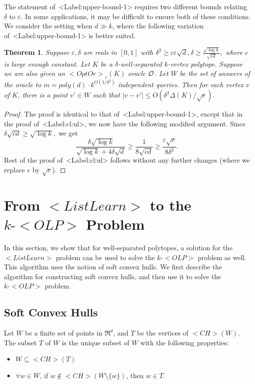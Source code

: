 \documentclass[11pt,letterpaper]{article}
\def\mathsf#1{<#1>}%
\def\xspace{}%
\def\Cref#1{<Label:#1>}%
\newtheorem{theorem}{Theorem}[section]
\theoremstyle{definition}
\theoremstyle{remark}
\newcommand{\ch}{{\mathsf{CH}}}
\newcommand{\olp}{{\mathsf {OLP}}\xspace}
\newcommand{\kolp}{k\mbox{-}\olp}
\newcommand{\ListLearn}{\mathsf {ListLearn}\xspace}
\newcommand{\opto}{{\mathsf{OptOr}}}
\begin{document}
The statement of~\Cref{upper-bound-1} requires two different bounds relating $\delta$ to $\varepsilon$. In some applications, it may be difficult to ensure both of these conditions. We consider the setting when $d \gg k$, where the following variation of~\Cref{upper-bound-1} is better suited. 

\begin{theorem}\label{upper-bound-2}
Suppose $\varepsilon,\delta$ are reals in $[0,1]$ with $\delta^2\geq c\varepsilon\sqrt d, \delta \geq \frac{ \sqrt{\log k}}{\sqrt{cd}},$ where $c$ is  large enough constant.  Let $K$ be a $\delta$-well-separated $k$-vertex polytope. Suppose we are also given an  $\opto_\varepsilon(K)$ oracle $\cal O$.
Let $W$ be the set of answers of the oracle to $m=poly(d)\cdot k^{O(1/\delta^2)}$ independent queries.  Then for each vertex $v$ of $K$, there is a point $v' \in W$ such that $|v-v'| \leq O(\delta^2 \Delta(K)/\sqrt{c}).$
\end{theorem}
\begin{proof}
    The proof is identical to that of~\Cref{upper-bound-1}, except that in the proof of~\Cref{cl:ul}, we now have the following modified argument. Since $\delta \sqrt{cd} \geq \sqrt{\log k}, $ we get 
     $$\frac{\delta \sqrt{\log k}}{\sqrt{\log k} + 4 \delta \sqrt{d}}  \geq \frac{1}{8 \sqrt{cd}} \geq \frac{\varepsilon \sqrt{c}}{8 \delta^2}. $$
     Rest of the proof of~\Cref{cl:ul} follows without any further changes (where we replace $c$ by $\sqrt{c}$). 
\end{proof}
\section{From $\ListLearn$ to the  $\kolp$ Problem}
\label{sec:kolp}

In this section, we show that for well-separated polytopes, a solution for the $\ListLearn$ problem can be used to solve the $\kolp$ problem as well. This algorithm uses the notion of soft convex hulls. 
We first describe the algorithm for constructing soft convex hulls, and then use it to solve the $\kolp$ problem. 

\subsection{Soft Convex Hulls}
\label{sec:soft}
Let $W$ be a finite set of points in $\Re^d$, and
$T$ be the vertices of $\ch(W)$. The subset $T$ of $W$ is the unique subset of $W$ with the following properties: 
\begin{itemize}
\item[(P1)] $W\subseteq \ch(T)$
\item[(P2)] $\forall w\in W$, if $w\notin \ch(W\setminus \{w\})$, then $w \in T$. 
\end{itemize}
\end{document}
